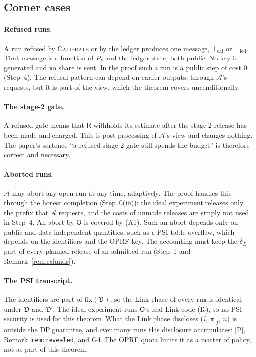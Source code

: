 \documentclass[11pt]{article}
\theoremstyle{definition}
\theoremstyle{plain}
\newcommand{\Rp}{\mathsf{R}}
\newcommand{\Op}{\mathsf{O}}
\newcommand{\bD}{\mathfrak D}
\newcommand{\fix}{\mathrm{fix}}
\newcommand{\Cal}{\textsc{Calibrate}}
\newcommand{\Pp}{\textup{[P]}}
\begin{document}
\subsection{Corner cases}
\label{sec:corner}

\paragraph{Refused runs.} A run refused by \Cal{} or by the ledger produces one message, $\bot_{\mathrm{cal}}$ or $\bot_{\mathrm{led}}$. That message is a function of $P_k$ and the ledger state, both public. No key is generated and no share is sent. In the proof such a run is a public step of cost $0$ (Step~4). The refusal pattern can depend on earlier outputs, through $\mathcal A$'s requests, but it is part of the view, which the theorem covers unconditionally.

\paragraph{The stage-2 gate.} A refused gate means that $\Rp$ withholds its estimate after the stage-2 release has been made and charged. This is post-processing of $\mathcal A$'s view and changes nothing. The paper's sentence ``a refused stage-2 gate still spends the budget'' is therefore correct and necessary.

\paragraph{Aborted runs.} $\mathcal A$ may abort any open run at any time, adaptively. The proof handles this through the honest completion (Step~0(iii)): the ideal experiment releases only the prefix that $\mathcal A$ requests, and the costs of unmade releases are simply not used in Step~4. An abort by $\Op$ is covered by (A1). Such an abort depends only on public and data-independent quantities, such as a PSI table overflow, which depends on the identifiers and the OPRF key. The accounting must keep the $\delta_B$ part of every planned release of an admitted run (Step~1 and Remark~\ref{rem:refunds}).

\paragraph{The PSI transcript.} The identifiers are part of $\fix(\bD)$, so the Link phase of every run is identical under $\bD$ and $\bD'$. The ideal experiment runs $\Op$'s real Link code (I3), so no PSI security is used for this theorem. What the Link phase discloses ($I$, $\pi|_I$, $n$) is outside the DP guarantee, and over many runs this disclosure accumulates: \Pp, Remark~\texttt{rem:revealed}, and G4. The OPRF quota limits it as a matter of policy, not as part of this theorem.
\end{document}
